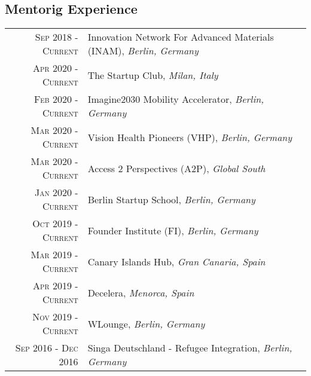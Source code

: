 \subsection{Mentorig Experience}
\begin{longtable}
	{r|p{13cm}}
	\textsc{Sep 2018 - Current} & Innovation Network For Advanced Materials (INAM), \emph{Berlin, Germany}\\
	\textsc{Apr 2020 - Current} & The Startup Club, \emph{Milan, Italy}\\
	\textsc{Feb 2020 - Current} & Imagine2030 Mobility Accelerator, \emph{Berlin, Germany}\\
	\textsc{Mar 2020 - Current} & Vision Health Pioneers (VHP), \emph{Berlin, Germany}\\
	\textsc{Mar 2020 - Current} & Access 2 Perspectives (A2P), \emph{Global South}\\
	\textsc{Jan 2020 - Current} & Berlin Startup School, \emph{Berlin, Germany}\\
	\textsc{Oct 2019 - Current} & Founder Institute (FI), \emph{Berlin, Germany}\\
	\textsc{Mar 2019 - Current} & Canary Islands Hub, \emph{Gran Canaria, Spain}\\
	\textsc{Apr 2019 - Current} & Decelera, \emph{Menorca, Spain}\\
	\textsc{Nov 2019 - Current} & WLounge, \emph{Berlin, Germany}\\
	\textsc{Sep 2016 - Dec 2016} & Singa Deutschland - Refugee Integration, \emph{Berlin, Germany}\\
\end{longtable}
